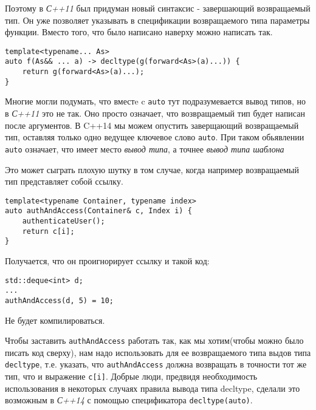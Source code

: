 		Поэтому в \textit{С++11} был придуман новый синтаксис - завершающий возвращаемый тип. Он уже позволяет указывать в спецификации возвращаемого типа параметры функции. Вместо того, что было написано наверху можно написать так.
		
\begin{verbatim}
template<typename... As>
auto f(As&& ... a) -> decltype(g(forward<As>(a)...)) {
	return g(forward<As>(a)...);
}
\end{verbatim}
		
		Многие могли подумать, что вместe c \texttt{auto} тут подразумевается вывод типов, но в \textit{С++11} это не так. Оно просто означает, что возвращаемый тип будет написан после аргументов. В C++14 мы можем опустить заверщающий возвращаемый тип, оставляя только одно ведущее ключевое слово \texttt{auto}. При таком обьявлении \texttt{auto} означает, что имеет место \textit{вывод типа}, а точнее \textit{вывод типа шаблона}
		
		Это может сыграть плохую шутку в том случае, когда например возвращаемый тип представляет собой ссылку.
\begin{verbatim}
template<typename Container, typename index>
auto authAndAccess(Container& c, Index i) {
	authenticateUser();
	return c[i];
}
\end{verbatim}
		Получается, что он проигнорирует ссылку и такой код:
\begin{verbatim}
std::deque<int> d;
...
authAndAccess(d, 5) = 10;
\end{verbatim}
		Не будет компилироваться.
		
		Чтобы заставить \texttt{authAndAccess} работать так, как мы хотим(чтобы можно было писать код сверху), нам надо использовать для ее возвращаемого типа выдов типа \texttt{decltype}, т.е. указать, что \texttt{authAndAccess} должна возвращать в точности тот же тип, что и выражение \texttt{c[i]}. Добрые люди, предвидя необходимость использования в некоторых случаях правила вывода типа decltype, сделали это возможным в \textit{С++14} с помощью спецификатора \texttt{decltype(auto)}.
		
